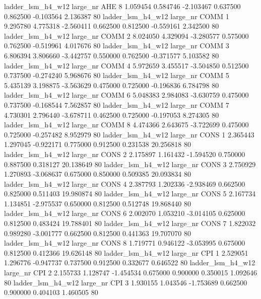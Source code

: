   ladder_lsm_h4_w12   large_nr      AHE                 8  1.059454  0.584746  -2.103467 0.637500 0.862500 -0.103564    2.136387 80
  ladder_lsm_h4_w12   large_nr     COMM                 1  9.295780  4.775318  -2.560411 0.662500 0.812500 -0.559161    2.342500 80
  ladder_lsm_h4_w12   large_nr     COMM                 2  8.024050  4.329094  -3.280577 0.575000 0.762500 -0.519961    4.017676 80
  ladder_lsm_h4_w12   large_nr     COMM                 3  6.806394  3.806660  -3.442757 0.550000 0.762500 -0.371577    5.103582 80
  ladder_lsm_h4_w12   large_nr     COMM                 4  5.972659  3.455517  -3.504850 0.512500 0.737500 -0.274240    5.968676 80
  ladder_lsm_h4_w12   large_nr     COMM                 5  5.435139  3.198875  -3.563629 0.475000 0.725000 -0.196836    6.784798 80
  ladder_lsm_h4_w12   large_nr     COMM                 6  5.048383  2.984083  -3.630759 0.475000 0.737500 -0.168544    7.562857 80
  ladder_lsm_h4_w12   large_nr     COMM                 7  4.730301  2.796440  -3.678711 0.462500 0.725000 -0.197053    8.274305 80
  ladder_lsm_h4_w12   large_nr     COMM                 8  4.474366  2.643675  -3.722699 0.475000 0.725000 -0.257482    8.952979 80
  ladder_lsm_h4_w12   large_nr     CONS                 1  2.365443  1.297045  -0.922171 0.775000 0.912500  0.231538   20.256818 80
  ladder_lsm_h4_w12   large_nr     CONS                 2  2.175897  1.161432  -1.594520 0.750000 0.887500  0.318127   20.138649 80
  ladder_lsm_h4_w12   large_nr     CONS                 3  2.750929  1.270893  -3.068637 0.675000 0.850000  0.509385   20.093834 80
  ladder_lsm_h4_w12   large_nr     CONS                 4  2.387793  1.202336  -2.938469 0.662500 0.825000  0.511403   19.980874 80
  ladder_lsm_h4_w12   large_nr     CONS                 5  2.167734  1.134851  -2.975537 0.650000 0.812500  0.512748   19.868440 80
  ladder_lsm_h4_w12   large_nr     CONS                 6  2.002070  1.053210  -3.014105 0.625000 0.812500  0.483424   19.788401 80
  ladder_lsm_h4_w12   large_nr     CONS                 7  1.822032  0.989280  -3.001777 0.662500 0.812500  0.441363   19.707070 80
  ladder_lsm_h4_w12   large_nr     CONS                 8  1.719771  0.946122  -3.053995 0.675000 0.812500  0.412366   19.626148 80
  ladder_lsm_h4_w12   large_nr      CPI                 1  2.529051  1.296776  -0.947737 0.737500 0.912500  0.332677    0.646522 80
  ladder_lsm_h4_w12   large_nr      CPI                 2  2.155733  1.128747  -1.454534 0.675000 0.900000  0.350015    1.092646 80
  ladder_lsm_h4_w12   large_nr      CPI                 3  1.930155  1.043546  -1.753689 0.662500 0.900000  0.404103    1.460505 80
